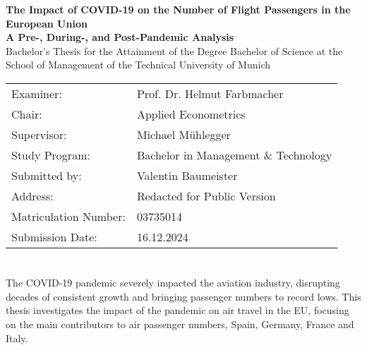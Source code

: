 \documentclass[12pt,onehalfspacing,headsepline,oneside,openright,a4paper, fleqn]{report}
\newcommand*{\getTitle}{The Impact of COVID-19 on the Number of Flight Passengers in the European Union}
\newcommand*{\getsubTitle}{A Pre-, During-, and Post-Pandemic Analysis}
\newcommand*{\getDoctype}{Bachelor’s Thesis for the Attainment of the Degree Bachelor of Science at the School of Management of the Technical University of Munich}
\newcommand*{\getSupervisor}{Prof. Dr. Helmut Farbmacher}
\newcommand*{\getChair}{Applied Econometrics}
\newcommand*{\getAdvisor}{Michael Mühlegger}
\newcommand*{\getAuthor}{Valentin Baumeister}
\newcommand*{\getAuthorAddress}{Redacted for Public Version}
\newcommand*{\getAuthorMatrNr}{03735014}
\newcommand*{\getSubmissionDate}{16.12.2024}
\newcommand*{\getCourseofStudy}{Bachelor in Management \& Technology}
\begin{document}
\begin{titlepage}
  \begin{flushright}
  \end{flushright}
  
\begin{flushleft}
  \vspace{30mm}
  {\huge\bfseries\getTitle{}}\\  
   \vspace{10mm}
   {\Large\bfseries\getsubTitle{}}\\  
  
  \vspace{30mm}
  {\Large\getDoctype{}}\\
    
  \vspace{50mm}
  
  \begin{tabular}{l l}
      Examiner:            & \getSupervisor{} \\
      	Chair:             & \getChair{}\\
    Supervisor:            & \getAdvisor{} \\
  Study Program:           & \getCourseofStudy{} \\
      Submitted by:        & \getAuthor{} \\
        Address:           & \getAuthorAddress{}\\
     Matriculation Number: & \getAuthorMatrNr{}\\
     Submission Date:      & \getSubmissionDate{} \\
  \end{tabular}
 \end{flushleft}

\end{titlepage}




\chapter*{\abstractname}

The COVID-19 pandemic severely impacted the aviation industry, disrupting decades of consistent growth and bringing passenger numbers to record lows. This thesis investigates the impact of the pandemic on air travel in the EU, focusing on the main contributors to air passenger numbers, Spain, Germany, France and Italy. 
\end{document}
